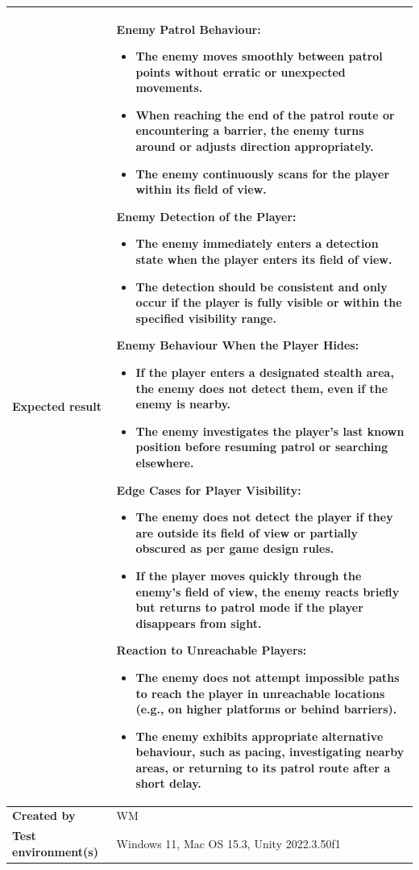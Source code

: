 \documentclass[11pt, a4paper]{article}
\begin{document}
\begin{center}
\begin{tabularx}{\linewidth}{|>{\raggedright\arraybackslash}m{4cm}|X|}
    \hline
    \textbf{Expected result} &
    \textbf{Enemy Patrol Behaviour:}
    \begin{itemize}
        \item The enemy moves smoothly between patrol points without erratic or unexpected movements.
        \item When reaching the end of the patrol route or encountering a barrier, the enemy turns around or adjusts direction appropriately.
        \item The enemy continuously scans for the player within its field of view.
    \end{itemize}
    \textbf{Enemy Detection of the Player:}
    \begin{itemize}
        \item The enemy immediately enters a detection state when the player enters its field of view.
        \item The detection should be consistent and only occur if the player is fully visible or within the specified visibility range.
    \end{itemize}
    \textbf{Enemy Behaviour When the Player Hides:}
    \begin{itemize}
        \item If the player enters a designated stealth area, the enemy does not detect them, even if the enemy is nearby.
        \item The enemy investigates the player’s last known position before resuming patrol or searching elsewhere.
    \end{itemize}
    \textbf{Edge Cases for Player Visibility:}
    \begin{itemize}
        \item The enemy does not detect the player if they are outside its field of view or partially obscured as per game design rules.
        \item If the player moves quickly through the enemy’s field of view, the enemy reacts briefly but returns to patrol mode if the player disappears from sight.
    \end{itemize}
    \textbf{Reaction to Unreachable Players:}
    \begin{itemize}
        \item The enemy does not attempt impossible paths to reach the player in unreachable locations (e.g., on higher platforms or behind barriers).
        \item The enemy exhibits appropriate alternative behaviour, such as pacing, investigating nearby areas, or returning to its patrol route after a short delay.
    \end{itemize}
    \\
    \hline
    \textbf{Created by} & WM \\
    \hline
    \textbf{Test environment(s)} & Windows 11, Mac OS 15.3, Unity 2022.3.50f1 \\
    \hline
\end{tabularx}
\end{center}
\end{document}
